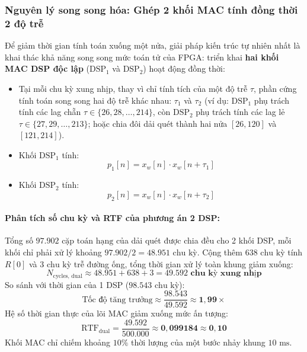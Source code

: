 \subsubsection*{Nguyên lý song song hóa: Ghép 2 khối MAC tính đồng thời 2 độ trễ}
Để giảm thời gian tính toán xuống một nửa, giải pháp kiến trúc tự nhiên nhất là khai thác khả năng song song mức toán tử của FPGA: triển khai \textbf{hai khối MAC DSP độc lập} ($\text{DSP}_1$ và $\text{DSP}_2$) hoạt động đồng thời:
\begin{itemize}[leftmargin=1.5em, itemsep=2pt]
    \item Tại mỗi chu kỳ xung nhịp, thay vì chỉ tính tích của một độ trễ $\tau$, phần cứng tính toán song song hai độ trễ khác nhau: $\tau_1$ và $\tau_2$ (ví dụ: $\text{DSP}_1$ phụ trách tính các lag chẵn $\tau \in \{26, 28, \dots, 214\}$, còn $\text{DSP}_2$ phụ trách tính các lag lẻ $\tau \in \{27, 29, \dots, 213\}$; hoặc chia đôi dải quét thành hai nửa $[26, 120]$ và $[121, 214]$).
    \item Khối $\text{DSP}_1$ tính:
    \begin{equation}
    p_1[n] = x_w[n] \cdot x_w[n+\tau_1]
    \end{equation}
    \item Khối $\text{DSP}_2$ tính:
    \begin{equation}
    p_2[n] = x_w[n] \cdot x_w[n+\tau_2]
    \end{equation}
\end{itemize}

\paragraph{Phân tích số chu kỳ và RTF của phương án 2 DSP:}
Tổng số $97.902\text{ cặp toán hạng}$ của dải quét được chia đều cho 2 khối DSP, mỗi khối chỉ phải xử lý khoảng $97.902 / 2 = 48.951\text{ chu kỳ}$. Cộng thêm $638\text{ chu kỳ}$ tính $R[0]$ và $3\text{ chu kỳ}$ trễ đường ống, tổng thời gian xử lý toàn khung giảm xuống:
\begin{equation}
N_{\text{cycles, dual}} \approx 48.951 + 638 + 3 = \mathbf{49.592\text{ chu kỳ xung nhịp}}
\end{equation}
So sánh với thời gian của 1 DSP ($98.543\text{ chu kỳ}$):
\begin{equation}
\text{Tốc độ tăng trưởng} \approx \frac{98.543}{49.592} \approx \mathbf{1{,}99\times}
\end{equation}
Hệ số thời gian thực của lõi MAC giảm xuống mức ấn tượng:
\begin{equation}
\text{RTF}_{\text{dual}} = \frac{49.592}{500.000} \approx \mathbf{0{,}099184 \approx 0{,}10}
\end{equation}
Khối MAC chỉ chiếm khoảng $10\%$ thời lượng của một bước nhảy khung $10\text{ ms}$.

